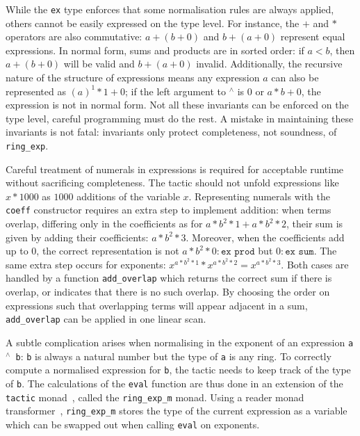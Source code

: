 \documentclass{llncs}
\newcommand{\lean}[1]{\texttt{#1}\xspace} %
\newcommand{\ex}{\lean{ex}}
\newcommand{\pow}{{${}^\wedge$}\xspace}
\newcommand{\ringexp}{\lean{ring\_exp}}
\begin{document}
While the \ex type enforces that some normalisation rules are always applied,
others cannot be easily expressed on the type level.
For instance, the $+$ and $*$ operators are also commutative:
$a + (b + 0)$ and $b + (a + 0)$ represent equal expressions.
In normal form, sums and products are in sorted order: if $a < b$, then $a + (b + 0)$ will be valid and $b + (a + 0)$ invalid.
Additionally, the recursive nature of the structure of expressions
means any expression $a$ can also be represented as $(a)^1*1 + 0$;
if the left argument to \pow is $0$ or $a * b + 0$, the expression is not in normal form.
Not all these invariants can be enforced on the type level,
careful programming must do the rest.
A mistake in maintaining these invariants is not fatal: invariants only protect completeness, not soundness, of \ringexp.

Careful treatment of numerals in expressions is required for acceptable runtime without sacrificing completeness.
The tactic should not unfold expressions like $x * 1000$ as $1000$ additions of the variable $x$.
Representing numerals with the \lean{coeff} constructor requires an extra step to implement addition:
when terms overlap, differing only in the coefficients as for $a * b^2 * 1 + a * b^2 * 2$,
their sum is given by adding their coefficients: $a * b^2 * 3$.
Moreover, when the coefficients add up to $0$, the correct representation is not $a * b^2 * 0 : \lean{ex prod}$ but $0 : \lean{ex sum}$.
The same extra step occurs for exponents: $x ^ {a * b^2 * 1} * x ^ {a * b^2 * 2} %
= x ^ {a * b^2 * 3}$.
Both cases are handled by a function \lean{add\_overlap} which returns the correct sum if there is overlap,
or indicates that there is no such overlap.
By choosing the order on expressions such that overlapping terms will appear adjacent in a sum,
\lean{add\_overlap} can be applied in one linear scan.

A subtle complication arises when normalising in the exponent of an expression \lean{a \pow b}:
\lean{b} is always a natural number but the type of \lean{a} is any ring.
To correctly compute a normalised expression for \lean{b},
the tactic needs to keep track of the type of \lean{b}.
The calculations of the \lean{eval} function are thus done in an extension of the \lean{tactic} monad~\cite{lean-tactics},
called the \lean{ring\_exp\_m} monad.
Using a reader monad transformer~\cite{monad-transformers},
\lean{ring\_exp\_m} stores the type of the current expression
as a variable which can be swapped out when calling \lean{eval} on exponents.
\end{document}
